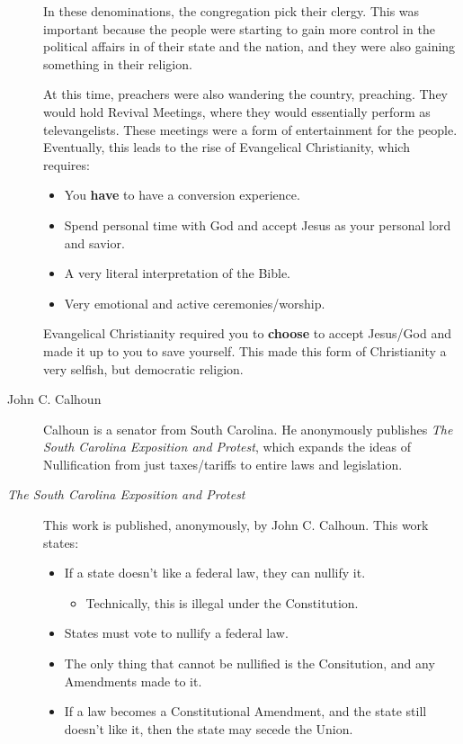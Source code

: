 \begin{description}
  In these denominations, the congregation pick their clergy.
  This was important because the people were starting to gain more control in the political affairs in of their state and the nation, and they were also gaining something in their religion.

  At this time, preachers were also wandering the country, preaching.
  They would hold Revival Meetings, where they would essentially perform as televangelists.
  These meetings were a form of entertainment for the people.
  Eventually, this leads to the rise of Evangelical Christianity, which requires:
  \begin{itemize}[noitemsep]
  \item You \textbf{have} to have a conversion experience.
  \item Spend personal time with God and accept Jesus as your personal lord and savior.
  \item A very literal interpretation of the Bible.
  \item Very emotional and active ceremonies/worship.
  \end{itemize}

  Evangelical Christianity required you to \textbf{choose} to accept Jesus/God and made it up to you to save yourself.
  This made this form of Christianity a very selfish, but democratic religion.

\item[John C. Calhoun] Calhoun is a senator from South Carolina.
  He anonymously publishes \textit{The South Carolina Exposition and Protest}, which expands the ideas of Nullification from just taxes/tariffs to entire laws and legislation.

\item[\textit{The South Carolina Exposition and Protest}] This work is published, anonymously, by John C. Calhoun.
  This work states:
  \begin{itemize}[noitemsep]
  \item If a state doesn't like a federal law, they can nullify it.
    \begin{itemize}[noitemsep]
    \item Technically, this is illegal under the Constitution.
    \end{itemize}
  \item States must vote to nullify a federal law.
  \item The only thing that cannot be nullified is the Consitution, and any Amendments made to it.
  \item If a law becomes a Constitutional Amendment, and the state still doesn't like it, then the state may secede the Union.
  \end{itemize}


\end{description}
